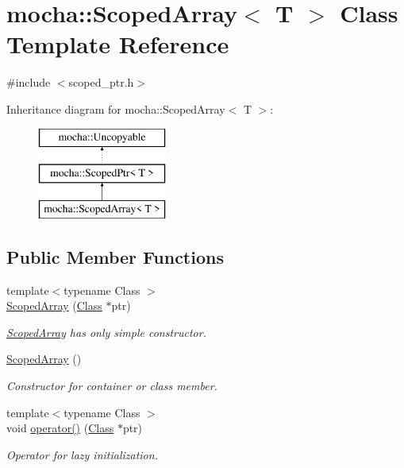 \hypertarget{classmocha_1_1_scoped_array}{
\section{mocha::ScopedArray$<$ T $>$ Class Template Reference}
\label{classmocha_1_1_scoped_array}
}


{\ttfamily \#include $<$scoped\_\-ptr.h$>$}

Inheritance diagram for mocha::ScopedArray$<$ T $>$:\begin{figure}[H]
\begin{center}
\leavevmode
\includegraphics[height=3.000000cm]{classmocha_1_1_scoped_array}
\end{center}
\end{figure}
\subsection*{Public Member Functions}
\begin{DoxyCompactItemize}
\item 
{\footnotesize template$<$typename Class $>$ }\\\hyperlink{classmocha_1_1_scoped_array_ac4f3fb1441a6bac79c5174f3a5df874d}{ScopedArray} (\hyperlink{classmocha_1_1_class}{Class} $\ast$ptr)
\begin{DoxyCompactList}\small\item\em \hyperlink{classmocha_1_1_scoped_array}{ScopedArray} has only simple constructor. \end{DoxyCompactList}\item 
\hyperlink{classmocha_1_1_scoped_array_a213d2853787d39615248ff821e39ace4}{ScopedArray} ()
\begin{DoxyCompactList}\small\item\em Constructor for container or class member. \end{DoxyCompactList}\item 
{\footnotesize template$<$typename Class $>$ }\\void \hyperlink{classmocha_1_1_scoped_array_a5da7acbefbe60db54062c8556fa0f745}{operator()} (\hyperlink{classmocha_1_1_class}{Class} $\ast$ptr)
\begin{DoxyCompactList}\small\item\em Operator for lazy initialization. \end{DoxyCompactList}\end{DoxyCompactItemize}


